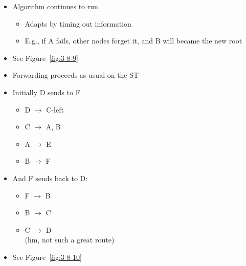 \documentclass[12pt]{ctexart}   %
\begin{document}
\begin{itemize}
	\item Algorithm continues to run
	\begin{itemize}
		\item Adapts by timing out information
		\item E.g., if A fails, other nodes forget it, and B will became the new root
	\end{itemize}
	
	\item See Figure~\ref{fig:3-8-9}
	
	\item Forwarding proceeds as usual on the ST
	\item Initially D sends to F
	\begin{itemize}
		\item D $\rightarrow$ C-left
		\item C $\rightarrow$ A, B
		\item A $\rightarrow$ E
		\item B $\rightarrow$ F
	\end{itemize}
	
	\item And F sends back to D:
	\begin{itemize}
		\item F $\rightarrow$ B
		\item B $\rightarrow$ C
		\item C $\rightarrow$ D \\
		(hm, not such a great route)
	\end{itemize}
	
	\item See Figure~\ref{fig:3-8-10}
	

\end{itemize}
\end{document}
